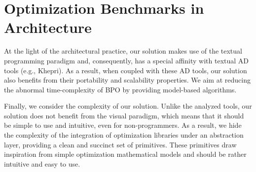\section{Optimization Benchmarks in Architecture}



At the light of the architectural practice, our solution makes use of the textual programming paradigm and, consequently, has a special affinity with textual \ac{AD} tools (e.g., Khepri). As a result, when coupled with these \ac{AD} tools, our solution also benefits from their portability and scalability properties. We aim at reducing the abnormal time-complexity of \ac{BPO} by providing model-based algorithms. 

Finally, we consider the complexity of our solution. Unlike the analyzed tools, our solution does not benefit from the visual paradigm, which means that it should be simple to use and intuitive, even for non-programmers. As a result, we hide the complexity of the integration of optimization libraries under an abstraction layer, providing a clean and succinct set of primitives. These primitives draw inspiration from simple optimization mathematical models and should be rather intuitive and easy to use. 



